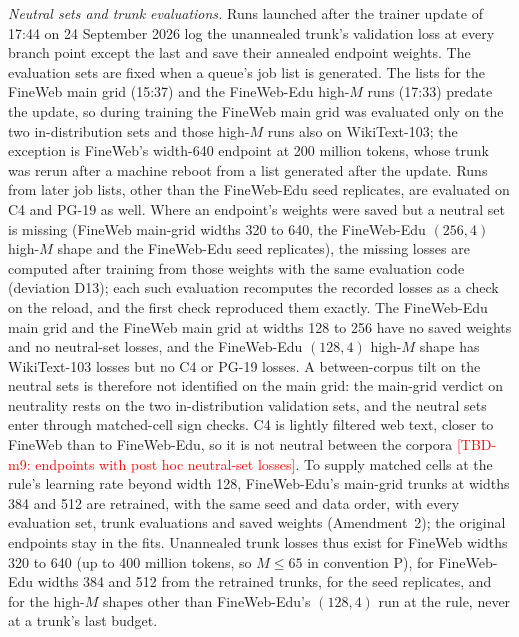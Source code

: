 \textit{Neutral sets and trunk evaluations.} Runs launched after the trainer update of 17:44 on 24 September 2026 log the
unannealed trunk's validation loss at every branch point except the last and save their annealed endpoint weights. The
evaluation sets are fixed when a queue's job list is generated. The lists for the FineWeb main grid (15:37) and the
FineWeb-Edu high-$M$ runs (17:33) predate the update, so during training the FineWeb main grid was evaluated only on the
two in-distribution sets and those high-$M$ runs also on WikiText-103; the exception is FineWeb's width-640 endpoint at
200 million tokens, whose trunk was rerun after a machine reboot from a list generated after the update. Runs from later
job lists, other than the FineWeb-Edu seed replicates, are evaluated on C4 and PG-19 as well. Where an endpoint's weights
were saved but a neutral set is missing (FineWeb main-grid widths 320 to 640, the FineWeb-Edu $(256,4)$ high-$M$ shape and
the FineWeb-Edu seed replicates), the missing losses are computed after training from those weights with the same
evaluation code (deviation D13); each such evaluation recomputes the recorded losses as a check on the reload, and the
first check reproduced them exactly. The FineWeb-Edu main grid and the FineWeb main grid at widths 128 to 256 have no
saved weights and no neutral-set losses, and the FineWeb-Edu $(128,4)$ high-$M$ shape has WikiText-103 losses but no C4 or
PG-19 losses. A between-corpus tilt on the neutral sets is therefore not identified on the main grid: the main-grid
verdict on neutrality rests on the two in-distribution validation sets, and the neutral sets enter through matched-cell
sign checks. C4 is lightly filtered web text, closer to FineWeb than to FineWeb-Edu, so it is not neutral between the
corpora \textcolor{red}{[TBD-m9: endpoints with post hoc neutral-set losses]}. To supply matched cells at the rule's
learning rate beyond width 128, FineWeb-Edu's main-grid trunks at widths 384 and 512 are retrained, with the same seed and
data order, with every evaluation set, trunk evaluations and saved weights (Amendment~2); the original endpoints stay in
the fits. Unannealed trunk losses thus exist for FineWeb widths 320 to 640 (up to 400 million tokens, so $M\le65$ in
convention P), for FineWeb-Edu widths 384 and 512 from the retrained trunks, for the seed replicates, and for the
high-$M$ shapes other than FineWeb-Edu's $(128,4)$ run at the rule, never at a trunk's last budget.


